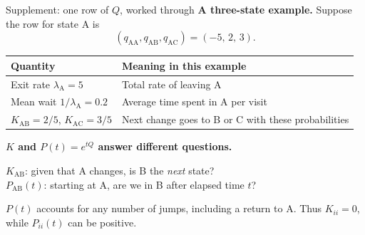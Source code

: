 \documentclass[aspectratio=169,11pt]{beamer}
\begin{document}
\begingroup
{}
\begin{frame}{Supplement: one row of $Q$, worked through}
\small
\textbf{A three-state example.} Suppose the row for state A is
\[
 (q_{\mathrm{AA}},q_{\mathrm{AB}},q_{\mathrm{AC}})=(-5,\,2,\,3).
\]
\begin{center}
\renewcommand{\arraystretch}{1.25}
\begin{tabular}{@{}ll@{}}
\toprule
\textbf{Quantity} & \textbf{Meaning in this example}\\
\midrule
Exit rate $\lambda_{\mathrm A}=5$ & Total rate of leaving A\\
Mean wait $1/\lambda_{\mathrm A}=0.2$ & Average time spent in A per visit\\
$K_{\mathrm{AB}}=2/5$, $K_{\mathrm{AC}}=3/5$ & Next change goes to B or C with these probabilities\\
\bottomrule
\end{tabular}
\end{center}
\textbf{$K$ and $P(t)=e^{tQ}$ answer different questions.}

$K_{\mathrm{AB}}$: given that A changes, is B the \emph{next} state?\\
$P_{\mathrm{AB}}(t)$: starting at A, are we in B after elapsed time $t$?

\alert{$P(t)$ accounts for any number of jumps, including a return to A.
Thus $K_{ii}=0$, while $P_{ii}(t)$ can be positive.}
\end{frame}
\endgroup
\end{document}
